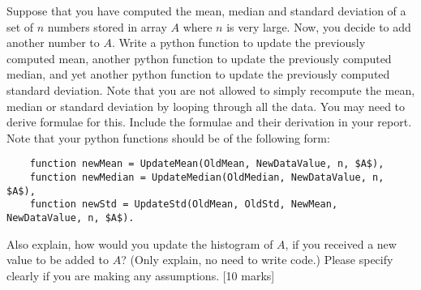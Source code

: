 \begin{que}
	Suppose that you have computed the mean, median and standard deviation of a
	set of $n$ numbers stored in array $A$ where $n$ is very large. Now, you decide
	to add another number to $A$. Write a python function to update the
	previously computed mean, another python function to update the previously
	computed median, and yet another python function to update the previously
	computed standard deviation. Note that you are not allowed to simply
	recompute the mean, median or standard deviation by looping through all the
	data. You may need to derive formulae for this. Include the formulae and
	their derivation in your report. Note that your python functions should be
	of the following form:

	\begin{verbatim}
	function newMean = UpdateMean(OldMean, NewDataValue, n, $A$),
	function newMedian = UpdateMedian(OldMedian, NewDataValue, n, $A$),
	function newStd = UpdateStd(OldMean, OldStd, NewMean, NewDataValue, n, $A$).
	\end{verbatim}

	Also explain, how would you update the histogram of $A$, if you received
	a new value to be added to $A$? (Only explain, no need to write code.)
	Please specify clearly if you are making any assumptions.
	\hspace*{\fill}[10 marks]
\end{que}

\begin{tcolorbox}
	\begin{sol}
	\end{sol}
\end{tcolorbox}
